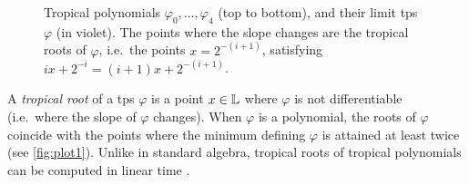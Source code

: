 \begin{figure}
\begin{center}
\end{center}
\caption{\small Tropical polynomials $\varphi_0,\dots,\varphi_4$ (top to bottom), and their limit tps $\varphi$ (in violet). The points where the slope changes are  the tropical roots of $\varphi$, i.e.~the points $x=2^{-(i+1)}$, satisfying $ix+2^{-i}=(i+1)x+2^{-(i+1)}$.}
\label{fig:plot1}
\end{figure}%

A \emph{tropical root} of a tps $\varphi$ is a point $x\in \mathbb{L}$ where $\varphi$ is not differentiable (i.e.~where the slope of $\varphi$ changes). When $\varphi$ is a polynomial, the roots of $\varphi$ coincide with the points where the minimum defining $\varphi$ is attained at least twice (see \autoref{fig:plot1}).
Unlike in standard algebra, tropical roots of tropical polynomials can be computed in linear time \cite{Noferini2015}. 


%


